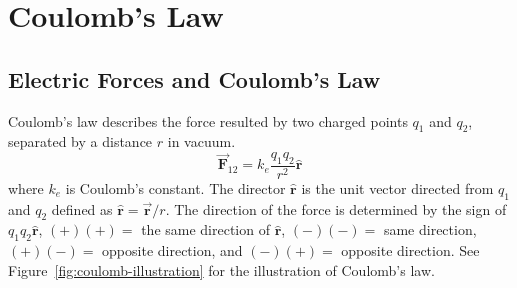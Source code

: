 \section{Coulomb's Law}
\subsection{Electric Forces and Coulomb's Law}
Coulomb's law describes the force resulted by two charged points $q_1$ and $q_2$, separated by a distance $r$ in vacuum.
\begin{equation}
  \vec{\boldsymbol{F}}_{12} = k_e \frac{q_1q_2}{r^2}\hat{\boldsymbol{r}}
\end{equation}
where $k_e$ is Coulomb's constant. The director $\hat{\boldsymbol{r}}$ is the unit vector directed from $q_1$ and $q_2$ defined as $\hat{\boldsymbol{r}}=\vec{\boldsymbol{r}}/r$. The direction of the force is determined by the sign of $q_1q_2\hat{\boldsymbol{r}}$, $(+)(+)=$ the same direction of $\hat{\boldsymbol{r}}$, $(-)(-)=$ same direction, $(+)(-)=$ opposite direction, and $(-)(+)=$ opposite direction.
See Figure~\ref{fig:coulomb-illustration} for the illustration of Coulomb's law.

